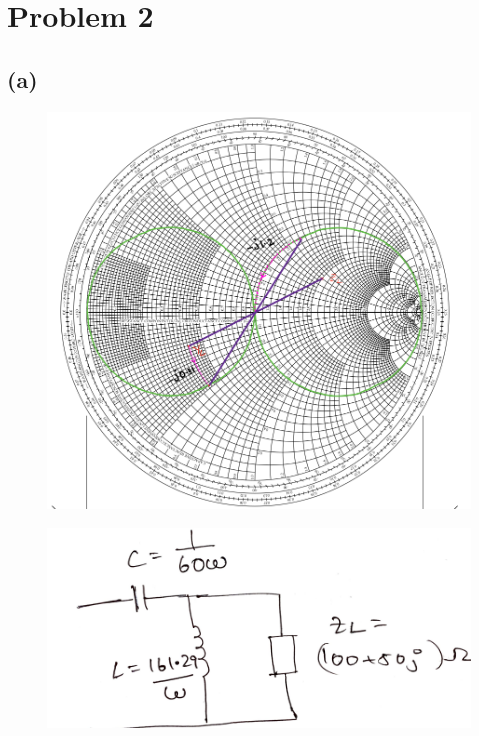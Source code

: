 \documentclass{article}
\begin{document}
\section*{\hfil Problem 2}
\subsection*{(a)}
\begin{figure}[H]
	\includegraphics[scale=0.5]{./figs/q2_s.png}
\end{figure}
\begin{figure}[H]
	\includegraphics[scale=0.3]{./figs/q2a.png}
\end{figure}
\end{document}
